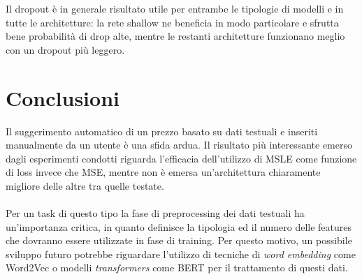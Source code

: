 Il dropout è in generale risultato utile per entrambe le tipologie di modelli e in tutte le
architetture: la rete shallow ne beneficia in modo particolare e sfrutta bene probabilità di drop 
alte, mentre le restanti architetture funzionano meglio con un dropout più leggero.

\section{Conclusioni}
Il suggerimento automatico di un prezzo basato su dati testuali e 
inseriti manualmente da un utente è una sfida ardua. Il risultato più interessante emerso dagli esperimenti 
condotti riguarda l'efficacia dell'utilizzo di MSLE come funzione di loss invece che MSE, mentre non
è emersa un'architettura chiaramente migliore delle altre tra quelle testate. 

\paragraph{} Per un task di questo tipo la fase di preprocessing dei dati testuali
ha un'importanza critica, in quanto definisce la tipologia ed il numero delle features che dovranno
essere utilizzate in fase di training. Per questo motivo, un possibile sviluppo futuro potrebbe riguardare 
l'utilizzo di tecniche di \emph{word embedding} come Word2Vec o modelli \emph{transformers} come 
BERT per il trattamento di questi dati.

\printbibliography

